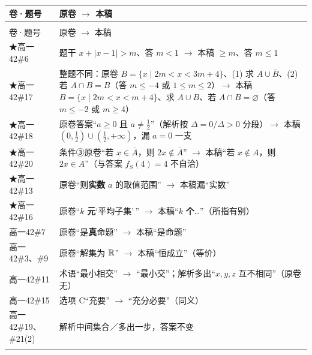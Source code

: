 \documentclass[a4paper,11pt]{article}
\begin{document}
\newcommand{\tabhdrD}{\rowcolor{white} 卷·题号 & 原卷 $\to$ 本稿 \\}
\begin{xltabular}{\textwidth}{@{}>{\raggedright\arraybackslash}p{6.88cm}>{\raggedright\arraybackslash}p{8.28cm}@{}}
\toprule
\tabhdrD
\midrule
\endfirsthead
{} \\
\midrule
\tabhdrD
\midrule
\endhead
\bottomrule
\endlastfoot
★高一42\#6 & 题干 \(x+\allowbreak \lvert x-1\rvert>m\)、答 \(m<1\) $\to$ 本稿 \(\geqslant\allowbreak  m\)、答 \(m\leqslant\allowbreak 1\) \\ \addlinespace[1pt]
★高一42\#17 & 整题不同：原卷 \(B=\allowbreak \{x\mid\allowbreak 2m<x<3m+\allowbreak 4\}\)、(1) 求 \(A\cup\allowbreak \overline B\)、(2) 若 \(A\cap\allowbreak  B=B\)（答 \(m\leqslant\allowbreak -4\) 或 \(1\leqslant\allowbreak  m\leqslant\allowbreak 2\)）$\to$ 本稿 \(B=\allowbreak \{x\mid\allowbreak 2m<x<m+\allowbreak 4\}\)、求 \(A\cup\allowbreak  B\)、若 \(A\cap\allowbreak  B=\allowbreak \varnothing\)（答 \(m\leqslant\allowbreak -2\) 或 \(m\geqslant\allowbreak 4\)） \\ \addlinespace[1pt]
★高一42\#18 & 原卷答案``\(a\geqslant\allowbreak 0\) 且 \(a\neq\frac12\)''（解析按 \(\Delta=\allowbreak 0/\Delta>0\) 分段）$\to$ 本稿 \((0,\allowbreak \frac12)\cup\allowbreak (\frac12,\allowbreak +\allowbreak \infty)\)，漏 \(a=\allowbreak 0\) 一支 \\ \addlinespace[1pt]
★高一42\#20 & 条件③原卷``若 \(x\in\overline A\)，则 \(2x\notin\overline A\)'' $\to$ 本稿``若 \(x\notin A\)，则 \(2x\in A\)''（与答案 \(f_S(4)=\allowbreak 4\) 不自洽） \\ \addlinespace[1pt]
★高一42\#13 & 原卷``则\textbf{实数} \(a\) 的取值范围'' $\to$ 本稿漏``实数'' \\ \addlinespace[1pt]
★高一42\#16 & 原卷``\(k\) \textbf{元}`平均子集'\,'' $\to$ 本稿``\(k\) \textbf{个}\ldots''（所指有别） \\ \addlinespace[1pt]
高一42\#7 & 原卷``是\textbf{真}命题'' $\to$ 本稿``是命题'' \\ \addlinespace[1pt]
高一42\#3、\#9 & 原卷``解集为 \(\mathbb{R}\)'' $\to$ 本稿``恒成立''（等价） \\ \addlinespace[1pt]
高一42\#11 & 术语``最小相交'' $\to$ ``最小交''；解析多出``\(x,y,z\) 互不相同''（原卷无） \\ \addlinespace[1pt]
高一42\#15 & 选项 C``充要'' $\to$ ``充分必要''（同义） \\ \addlinespace[1pt]
高一42\#19、\#21(2) & 解析中间集合／多出一步，答案不变 \\ \addlinespace[1pt]

\end{xltabular}
\end{document}
